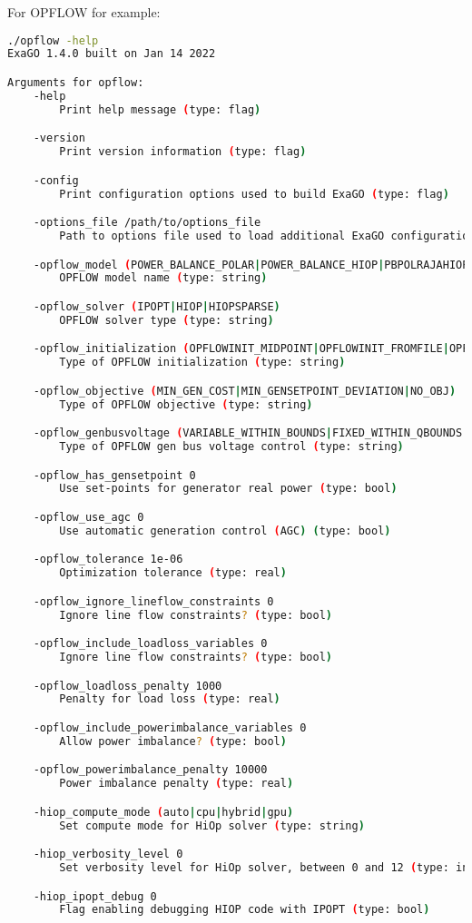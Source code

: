 For OPFLOW for example:
\begin{lstlisting}[language=bash]
./opflow -help
ExaGO 1.4.0 built on Jan 14 2022

Arguments for opflow:
	-help
		Print help message (type: flag)

	-version
		Print version information (type: flag)

	-config
		Print configuration options used to build ExaGO (type: flag)

	-options_file /path/to/options_file
		Path to options file used to load additional ExaGO configuration options (type: string)

	-opflow_model (POWER_BALANCE_POLAR|POWER_BALANCE_HIOP|PBPOLRAJAHIOP)
		OPFLOW model name (type: string)

	-opflow_solver (IPOPT|HIOP|HIOPSPARSE)
		OPFLOW solver type (type: string)

	-opflow_initialization (OPFLOWINIT_MIDPOINT|OPFLOWINIT_FROMFILE|OPFLOWINIT_ACPF|OPFLOWINIT_FLATSTART)
		Type of OPFLOW initialization (type: string)

	-opflow_objective (MIN_GEN_COST|MIN_GENSETPOINT_DEVIATION|NO_OBJ)
		Type of OPFLOW objective (type: string)

	-opflow_genbusvoltage (VARIABLE_WITHIN_BOUNDS|FIXED_WITHIN_QBOUNDS|FIXED_AT_SETPOINT)
		Type of OPFLOW gen bus voltage control (type: string)

	-opflow_has_gensetpoint 0
		Use set-points for generator real power (type: bool)

	-opflow_use_agc 0
		Use automatic generation control (AGC) (type: bool)

	-opflow_tolerance 1e-06
		Optimization tolerance (type: real)

	-opflow_ignore_lineflow_constraints 0
		Ignore line flow constraints? (type: bool)

	-opflow_include_loadloss_variables 0
		Ignore line flow constraints? (type: bool)

	-opflow_loadloss_penalty 1000
		Penalty for load loss (type: real)

	-opflow_include_powerimbalance_variables 0
		Allow power imbalance? (type: bool)

	-opflow_powerimbalance_penalty 10000
		Power imbalance penalty (type: real)

	-hiop_compute_mode (auto|cpu|hybrid|gpu)
		Set compute mode for HiOp solver (type: string)

	-hiop_verbosity_level 0
		Set verbosity level for HiOp solver, between 0 and 12 (type: int)

	-hiop_ipopt_debug 0
		Flag enabling debugging HIOP code with IPOPT (type: bool)
\end{lstlisting}

